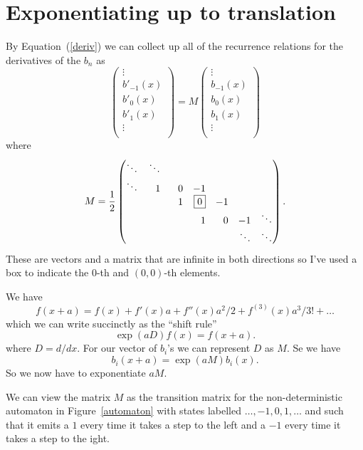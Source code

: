\documentclass{article}
\begin{document}
\section{Exponentiating up to translation}
By Equation~(\ref{deriv}) we can collect up all of the recurrence relations for the derivatives of the $b_n$ as
\[
\begin{pmatrix}
\vdots \\
b'_{-1}(x) \\
\boxed{b'_0(x)} \\
b'_1(x) \\
\vdots \\
\end{pmatrix}
=
M
\begin{pmatrix}
\vdots \\
b_{-1}(x) \\
\boxed{b_0(x)} \\
b_1(x) \\
\vdots \\
\end{pmatrix}
\]
where
\[
M=\frac{1}{2}
\begin{pmatrix*}[r]
\ddots & \ddots &   &    &   &   &        \\
\ddots & \hphantom{-{}}1 & 0 & -1 &   &   &        \\
       &   & \phantom{-{}}1 & \boxed{0} & -1 &   &        \\
       &   &   & 1 & 0 & -1 & \ddots \\
       &   &   &   &   & \ddots & \ddots \\
\end{pmatrix*}.
\]
These are vectors and a matrix that are infinite in both directions so I've used a box to indicate the $0$-th and $(0,0)$-th elements.

We have
\[
f(x+a) = f(x)+f'(x)a+f''(x)a^2/2+f^{(3)}(x)a^3/3!+\ldots
\]
which we can write succinctly as the ``shift rule''
\[
\exp(aD)f(x) = f(x+a).
\]
where $D=d/dx$.
For our vector of $b_i$'s we can represent $D$ as $M$.
Se we have
\[
b_i(x+a) = \exp(aM)b_i(x).
\]
So we now have to exponentiate $aM$.

We can view the matrix $M$ as the transition matrix for the non-deterministic automaton in Figure~\ref{automaton} with states labelled $\ldots, -1, 0, 1, \ldots$ and such that it emits a $1$ every time it takes a step to the left and a $-1$ every time it takes a step to the ight.
\end{document}
